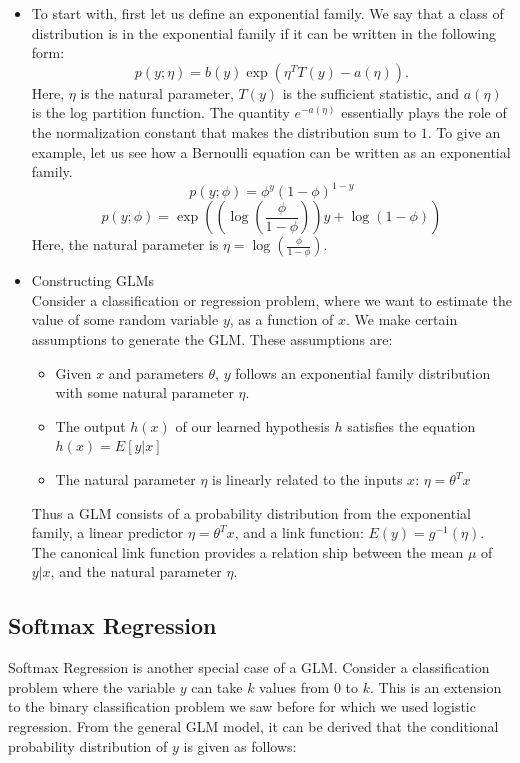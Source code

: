 \documentclass[twoside]{article}
\begin{document}
\begin{itemize}
\item To start with, first let us define an exponential family. We say that a class of distribution is in the exponential family if it can be written in the following form:
\[p(y;\eta) = b(y) \exp(\eta^T T(y) - a(\eta)).\]
Here, $\eta$ is the natural parameter, $T(y)$ is the sufficient statistic, and $a(\eta)$ is the log partition function. The quantity $e^{-a(\eta)}$ essentially plays the role of the normalization constant that makes the distribution sum to $1$. To give an example, let us see how a Bernoulli equation can be written as an exponential family.
\[ p(y;\phi)  = \phi^y(1-\phi)^{1-y}\]
\[p(y;\phi)  = \exp \left(\left(\log \left(\frac{\phi}{1-\phi}\right)\right)y + \log(1-\phi) \right) \]
Here, the natural parameter is $\eta = \log \left(\frac{\phi}{1-\phi}\right)$.

\item Constructing GLMs \\
Consider a classification or regression problem, where we want to estimate the value of some random variable $y$, as a function of $x$. We make certain assumptions to generate the GLM. These assumptions are:
\begin{itemize}
\item  Given $x$ and parameters $\theta$, $y$ follows an exponential family distribution with some natural parameter $\eta$.
\item The output $h(x)$ of our learned hypothesis $h$ satisfies the equation $h(x) = E[y|x]$
\item The natural parameter $\eta$ is linearly related to the inputs $x$: $\eta = \theta^Tx$
\end{itemize}
Thus a GLM consists of a probability distribution from the exponential family, a linear predictor $\eta = \theta^Tx$, and a link function: $E(y) = g^{-1}(\eta)$. The canonical link function provides a relation ship between the mean $\mu$ of $y|x$, and the natural parameter $\eta$.

\end{itemize}

\subsection {Softmax Regression}
Softmax Regression is another special case of a GLM. Consider a classification problem where the variable $y$ can take $k$ values from $0$ to $k$. This is an extension to the binary classification problem we saw before for which we used logistic regression. From the general GLM model, it can be derived that the conditional probability distribution of $y$ is given as follows: \\
\end{document}
